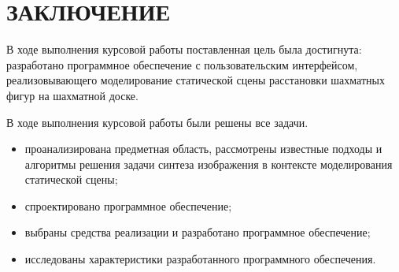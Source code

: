 \chapter*{ЗАКЛЮЧЕНИЕ}

В ходе выполнения курсовой работы поставленная цель была достигнута: разработано программное обеспечение с пользовательским интерфейсом, реализовывающего моделирование статической сцены расстановки шахматных фигур на шахматной доске.

В ходе выполнения курсовой работы были решены все задачи.

\begin{itemize}
	\item проанализирована предметная область, рассмотрены известные подходы и алгоритмы решения задачи синтеза изображения в контексте моделирования статической сцены;
	\item спроектировано программное обеспечение;
	\item выбраны средства реализации и разработано программное обеспечение;
	\item исследованы характеристики разработанного программного обеспечения.
\end{itemize}